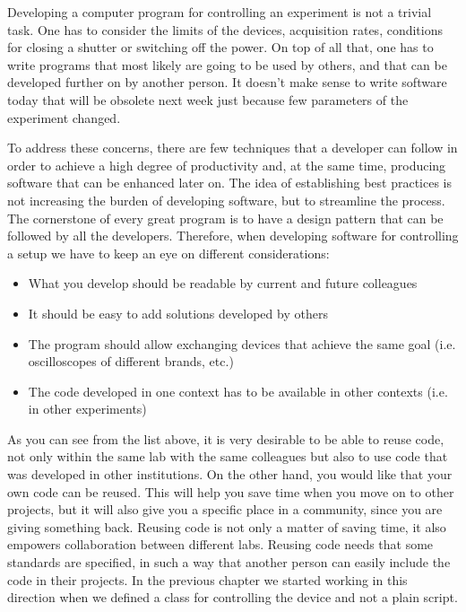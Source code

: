 Developing a computer program for controlling an experiment is not a
trivial task. One has to consider the limits of the devices, acquisition
rates, conditions for closing a shutter or switching off the power. On
top of all that, one has to write programs that most likely are going to
be used by others, and that can be developed further on by another
person. It doesn't make sense to write software today that will be
obsolete next week just because few parameters of the
experiment changed.

To address these concerns, there are few techniques that a developer can
follow in order to achieve a high degree of productivity and, at the
same time, producing software that can be enhanced later on. The idea of
establishing best practices is not increasing the burden of developing
software, but to streamline the process. The cornerstone of every great
program is to have a design pattern that can be followed by all the
developers. Therefore, when developing software for controlling a setup
we have to keep an eye on different considerations:

\begin{itemize}
\item What you develop should be readable by current and future colleagues
\item It should be easy to add solutions developed by others
\item The program should allow exchanging devices that achieve the same goal (i.e. oscilloscopes of different brands, etc.)
\item The code developed in one context has to be available in other contexts (i.e. in other experiments)
\end{itemize}

As you can see from the list above, it is very desirable to be able to
reuse code, not only within the same lab with the same colleagues but
also to use code that was developed in other institutions. On the other hand, you would like that your own code can be reused. This will help you save time when you move on to other projects, but it will also give you a specific place in a community, since you are giving something back. Reusing code is not only a matter of saving time, it also empowers collaboration between different labs. Reusing code needs that some standards are specified, in such a way that another person can easily include the code in their projects. In the previous chapter we started working in this direction when we defined a class for controlling the device and not a plain script.

